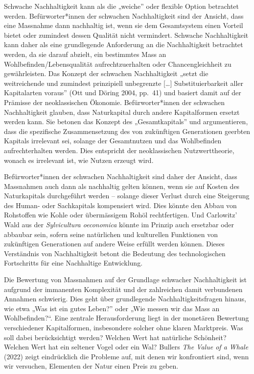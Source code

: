 \documentclass[
  nswissgerman,
  a4paper,
  openany]{book}
\begin{document}
Schwache Nachhaltigkeit kann als die „weiche'' oder flexible Option
betrachtet werden. Befürworter*innen der schwachen Nachhaltigkeit sind
der Ansicht, dass eine Massnahme dann nachhaltig ist, wenn sie dem
Gesamtsystem einen Vorteil bietet oder zumindest dessen Qualität nicht
vermindert. Schwache Nachhaltigkeit kann daher als eine grundlegende
Anforderung an die Nachhaltigkeit betrachtet werden, da sie darauf
abzielt, ein bestimmtes Mass an Wohlbefinden/Lebensqualität
aufrechtzuerhalten oder Chancengleichheit zu gewährleisten. Das Konzept
der schwachen Nachhaltigkeit „setzt die weitreichende und zumindest
prinzipiell unbegrenzte {[}\ldots{]} Substituierbarkeit aller
Kapitalarten voraus'' (Ott und Döring 2004, pp.~41) und basiert damit
auf der Prämisse der neoklassischen Ökonomie. Befürworter*innen der
schwachen Nachhaltigkeit glauben, dass Naturkapital durch andere
Kapitalformen ersetzt werden kann. Sie betonen das Konzept des
„Gesamtkapitals'' und argumentieren, dass die spezifische
Zusammensetzung des von zukünftigen Generationen geerbten Kapitals
irrelevant sei, solange der Gesamtnutzen und das Wohlbefinden
aufrechterhalten werden. Dies entspricht der neoklassischen
Nutzwerttheorie, wonach es irrelevant ist, wie Nutzen erzeugt wird.

Befürworter*innen der schwachen Nachhaltigkeit sind daher der Ansicht,
dass Massnahmen auch dann als nachhaltig gelten können, wenn sie auf
Kosten des Naturkapitals durchgeführt werden -- solange dieser Verlust
durch eine Steigerung des Human- oder Sachkapitals kompensiert wird.
Dies könnte den Abbau von Rohstoffen wie Kohle oder übermässigem Rohöl
rechtfertigen. Und Carlowitz' Wald aus der \emph{Sylvicultura
oeconomica} könnte im Prinzip auch ersetzbar oder abbaubar sein, sofern
seine natürlichen und kulturellen Funktionen von zukünftigen
Generationen auf andere Weise erfüllt werden können. Dieses Verständnis
von Nachhaltigkeit betont die Bedeutung des technologischen Fortschritts
für eine Nachhaltige Entwicklung.

Die Bewertung von Massnahmen auf der Grundlage schwacher Nachhaltigkeit
ist aufgrund der immanenten Komplexität und der zahlreichen damit
verbundenen Annahmen schwierig. Dies geht über grundlegende
Nachhaltigkeitsfragen hinaus, wie etwa „Was ist ein gutes Leben?'' oder
„Wie messen wir das Mass an Wohlbefinden?{\kern0pt}``. Eine zentrale
Herausforderung liegt in der monetären Bewertung verschiedener
Kapitalformen, insbesondere solcher ohne klaren Marktpreis. Was soll
dabei berücksichtigt werden? Welchen Wert hat natürliche Schönheit?
Welchen Wert hat ein seltener Vogel oder ein Wal? Bullers \emph{The
Value of a Whale} (2022) zeigt eindrücklich die Probleme auf, mit denen
wir konfrontiert sind, wenn wir versuchen, Elementen der Natur einen
Preis zu geben.
\end{document}
